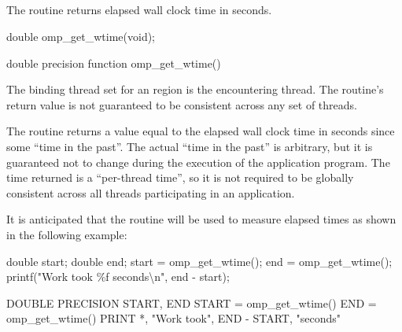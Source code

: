 \vspace{-12pt}









\subsection{}
\label{subsec:omp_get_wtime}
\summary
The  routine returns elapsed wall clock time in seconds.

\format
\begin{ccppspecific}
\begin{boxedcode}
double omp\_get\_wtime(void);
\end{boxedcode}
\end{ccppspecific}

\begin{fortranspecific}
\begin{boxedcode}
double precision function omp\_get\_wtime()
\end{boxedcode}
\end{fortranspecific}

\binding
The binding thread set for an  region is the encountering thread. The 
routine's return value is not guaranteed to be consistent across any set of threads.

\effect
The  routine returns a value equal to the elapsed wall clock time in 
seconds since some ``time in the past''. The actual ``time in the past'' is arbitrary, but it is 
guaranteed not to change during the execution of the application program. The time 
returned is a ``per-thread time'', so it is not required to be globally consistent across all 
threads participating in an application.

\begin{note}
It is anticipated that the routine will be used to measure elapsed times as shown 
in the following example:

\begin{ccppspecific}
\begin{boxedcode}
double start;
double end;
start = omp\_get\_wtime();
end = omp\_get\_wtime();
printf("Work took \%f seconds{\textbackslash}n", end - start);
\end{boxedcode}
\end{ccppspecific}

\begin{fortranspecific}
\begin{boxedcode}
DOUBLE PRECISION START, END
START = omp\_get\_wtime()
END = omp\_get\_wtime()
PRINT *, "Work took", END - START, "seconds"
\end{boxedcode}
\end{fortranspecific}
\end{note}











